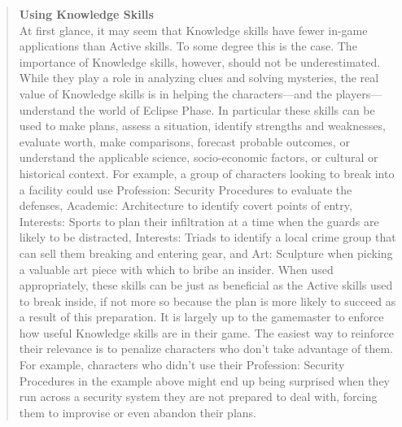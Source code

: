 \begin{quotation}
\textbf{Using Knowledge Skills}
\\
At first glance, it may seem that Knowledge skills have
fewer in-game applications than Active skills. To some
degree this is the case. The importance of Knowledge
skills, however, should not be underestimated. While
they play a role in analyzing clues and solving mysteries, the real value of Knowledge skills is in helping the
characters—and the players—understand the world of
Eclipse Phase. In particular these skills can be used to
make plans, assess a situation, identify strengths and
weaknesses, evaluate worth, make comparisons, forecast
probable outcomes, or understand the applicable science,
socio-economic factors, or cultural or historical context.
   For example, a group of characters looking to break
into a facility could use Profession: Security Procedures
to evaluate the defenses, Academic: Architecture to
identify covert points of entry, Interests: Sports to plan
their infiltration at a time when the guards are likely to
be distracted, Interests: Triads to identify a local crime
group that can sell them breaking and entering gear,
and Art: Sculpture when picking a valuable art piece
with which to bribe an insider. When used appropriately,
these skills can be just as beneficial as the Active skills
used to break inside, if not more so because the plan
is more likely to succeed as a result of this preparation.
   It is largely up to the gamemaster to enforce how
useful Knowledge skills are in their game. The easiest
way to reinforce their relevance is to penalize characters who don’t take advantage of them. For example,
characters who didn’t use their Profession: Security
Procedures in the example above might end up being
surprised when they run across a security system they
are not prepared to deal with, forcing them to improvise or even abandon their plans.
\end{quotation}










%


